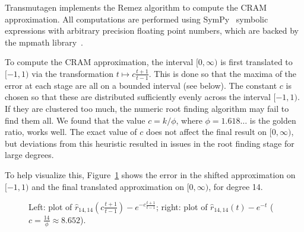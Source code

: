 Transmutagen implements the Remez algorithm to compute the CRAM approximation.
All computations are performed using SymPy~\cite{10.7717/peerj-cs.103}
symbolic expressions with arbitrary precision floating point numbers, which
are backed by the mpmath library~\cite{ationneeded}.

To compute the CRAM approximation, the interval $[0, \infty)$ is first
translated to $[-1, 1)$ via the transformation $t\mapsto c\frac{t+1}{t-1}$.
  This is done so that the maxima of the error at each
stage are all on a bounded interval (see below). The constant $c$ is chosen so
that these are distributed sufficiently evenly across the interval $[-1, 1)$.
If they are clustered too much, the numeric root finding algorithm may fail to
find them all. We found that the value $c=k/\phi$, where $\phi=1.618\ldots$ is
the golden ratio, works well. The exact value of $c$ does not affect the final
result on $[0, \infty)$, but deviations from this heuristic resulted in issues
in the root finding stage for large degrees.

To help visualize this, Figure~\ref{fig:cram-plot} shows the error in the
shifted approximation on $[-1, 1)$ and the final translated approximation on
$[0, \infty)$, for degree 14.

\begin{figure}[!ht]
\centering
\resizebox{\textwidth}{!}{}
\caption{Left: plot of $\hat{r}_{14, 14}\left(c\frac{t+1}{t-1}\right) -
  e^{-c\frac{t+1}{t-1}}$; right: plot of $\hat{r}_{14, 14}(t) -
e^{-t}$ ($c=\frac{14}{\phi}\approx 8.652$).}
\label{fig:cram-plot}
\end{figure}


